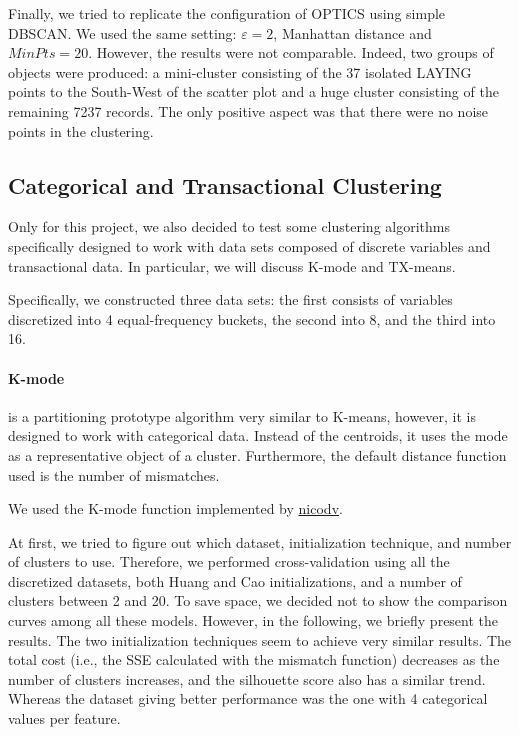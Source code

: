 \documentclass[10pt, a4paper, twocolumn]{article}
\begin{document}
Finally, we tried to replicate the configuration of OPTICS using simple DBSCAN. We used the same setting: $\varepsilon=2$, Manhattan distance and $MinPts=20$. However, the results were not comparable. Indeed, two groups of objects were produced: a mini-cluster consisting of the 37 isolated LAYING points to the South-West of the scatter plot and a huge cluster consisting of the remaining 7237 records. The only positive aspect was that there were no noise points in the clustering.

\subsection*{Categorical and Transactional Clustering}

Only for this project, we also decided to test some clustering algorithms specifically designed to work with data sets composed of discrete variables and transactional data. In particular, we will discuss K-mode and TX-means.

Specifically, we constructed three data sets: the first consists of variables discretized into 4 equal-frequency buckets, the second into 8, and the third into 16.

\paragraph{K-mode} is a partitioning prototype algorithm very similar to K-means, however, it is designed to work with categorical data. Instead of the centroids, it uses the mode as a representative object of a cluster. Furthermore, the default distance function used is the number of mismatches. 

We used the K-mode function implemented by \href{GitHub - nicodv/kmodes: Python implementations of the k-modes and k-prototypes clustering algorithms, for clustering categorical data}{nicodv}.

At first, we tried to figure out which dataset, initialization technique, and number of clusters to use. Therefore, we performed cross-validation using all the discretized datasets, both Huang and Cao initializations, and a number of clusters between 2 and 20. To save space, we decided not to show the comparison curves among all these models. However, in the following, we briefly present the results. The two initialization techniques seem to achieve very similar results. The total cost (i.e., the SSE calculated with the mismatch function) decreases as the number of clusters increases, and the silhouette score also has a similar trend. Whereas the dataset giving better performance was the one with 4 categorical values per feature. 
\end{document}
